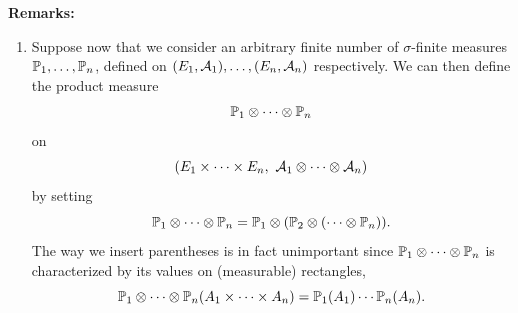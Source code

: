 \documentclass[../Main.tex]{subfiles}
\begin{document}
\textbf{Remarks:} 
\begin{enumerate}
\item Suppose now that we consider an arbitrary finite number of $\sigma$-finite measures $\mathbb{P}_1,\ldots,\mathbb{P}_n$, defined on $(E_1,\mathcal{A}_1),\ldots,(E_n,\mathcal{A}_n)$ respectively. We can then define the product measure
\[ \mathbb{P}_1 \otimes \cdots \otimes \mathbb{P}_n \]
on
\[ (E_1 \times \cdots \times E_n,\ \mathcal{A}_1 \otimes \cdots \otimes \mathcal{A}_n) \]
by setting
\[ \mathbb{P}_1 \otimes \cdots \otimes \mathbb{P}_n = \mathbb{P}_1 \otimes (\mathbb{P}_2 \otimes (\cdots \otimes \mathbb{P}_n)). \]
The way we insert parentheses is in fact unimportant since $\mathbb{P}_1 \otimes \cdots \otimes \mathbb{P}_n$ is characterized by its values on (measurable) rectangles,
\[ \mathbb{P}_1 \otimes \cdots \otimes \mathbb{P}_n(A_1 \times \cdots \times A_n) = \mathbb{P}_1(A_1)\cdots\mathbb{P}_n(A_n). \]
\end{enumerate}
\end{document}
